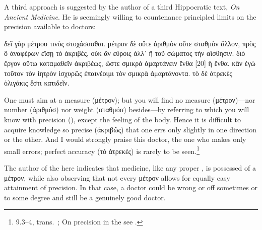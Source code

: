 \documentclass[11pt,letterpaper,oneside]{amsart} %
\begin{document}
A third approach is suggested by the author of a third Hippocratic text, \emph{On Ancient Medicine}. He is seemingly willing to countenance principled limits on the precision available to doctors:\begin{squote}δεῖ γὰρ μέτρου τινὸς στοχάσασθαι. μέτρον δὲ οὔτε ἀριθμὸν οὔτε σταθμὸν ἄλλον, πρὸς ὃ ἀναφέρων εἴσῃ τὸ ἀκριβές, οὐκ ἂν εὕροις ἀλλ᾽ ἢ τοῦ σώματος τὴν αἴσθησιν. διὸ ἔργον οὕτω καταμαθεῖν ἀκριβέως, ὥστε σμικρὰ ἁμαρτάνειν ἔνθα [20] ἢ ἔνθα. κἂν ἐγὼ τοῦτον τὸν ἰητρὸν ἰσχυρῶς ἐπαινέοιμι τὸν σμικρὰ ἁμαρτάνοντα. τὸ δὲ ἀτρεκὲς ὀλιγάκις ἔστι κατιδεῖν.

\vspace{0.05in}

\noindent One must aim at a measure (μέτρον); but you will find no measure (μέτρον)---nor number (ἀριθμόσ) nor weight (σταθμόσ) besides---by referring to which you will know with precision (\akribeia), except the feeling of the body. Hence it is difficult to acquire knowledge so precise (ἀκριβῶς) that one errs only slightly in one direction or the other. And I would strongly praise this doctor, the one who makes only small errors; perfect accuracy (τὸ ἀτρεκές) is rarely to be seen.\footnote{ 9.3--4, trans.\ ; On precision in the  see \citet[app.\ 2]{schiefsky2005}.}\end{squote} The author of the  here indicates that medicine, like any proper \techne, is possessed of a μέτρον, while also observing that not every μέτρον allows for equally easy attainment of precision. In that case, a doctor could be wrong or off sometimes or to some degree and still be a genuinely good doctor.
\end{document}
